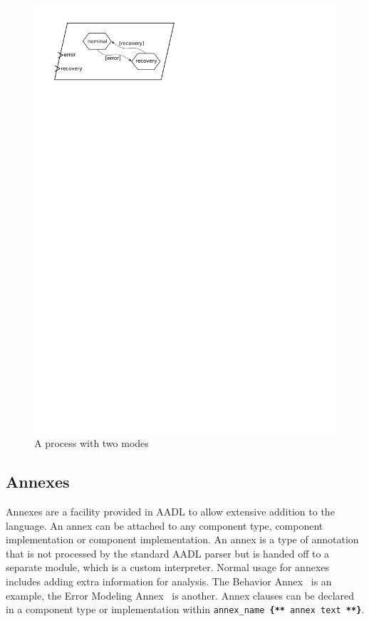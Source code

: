 \begin{figure}
\centering
\includegraphics[scale=0.75]{figs/modes}
\caption{A process with two modes}
\label{fig:modes}
\end{figure}

\subsection{Annexes}
Annexes are a facility provided in AADL to allow extensive addition to
the language. An annex can be attached to any component type,
component implementation or component implementation. An annex is a
type of annotation that is not processed by the standard AADL parser
but is handed off to a separate module, which is a custom
interpreter. Normal usage for annexes includes adding extra
information for analysis. The Behavior Annex~\cite{filali@iceccs07} is
an example, the Error Modeling Annex~\cite{aadlerrormodel, ana@corr07}
is another. Annex clauses can be declared in a component type or
implementation within \texttt{annex\_name \textbf{\{**}
  annex text \textbf{**\}}}.

